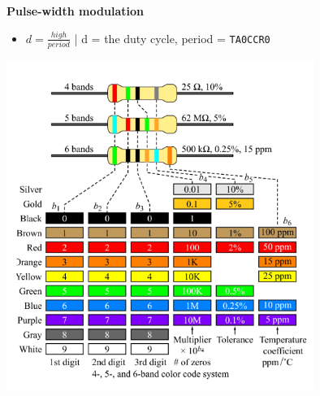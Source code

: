 \documentclass{article}
\begin{document}
\textbf{Pulse-width modulation}
\begin{itemize}
    \item $d = \frac{high}{period}$ | d = the duty cycle, period = \texttt{TA0CCR0}
\end{itemize}
\includegraphics[width=10cm]{resistors.png}
\end{document}
